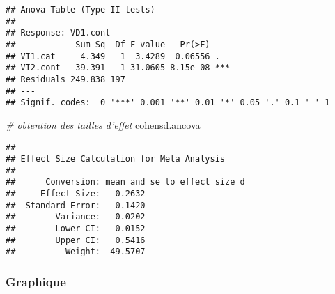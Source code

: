 \documentclass[
]{book}
\newenvironment{Shaded}{\begin{snugshade}}{\end{snugshade}}
\newcommand{\CommentTok}[1]{\textcolor[rgb]{0.56,0.35,0.01}{\textit{#1}}}
\newcommand{\NormalTok}[1]{#1}
\begin{document}
\begin{verbatim}
## Anova Table (Type II tests)
## 
## Response: VD1.cont
##            Sum Sq  Df F value   Pr(>F)    
## VI1.cat     4.349   1  3.4289  0.06556 .  
## VI2.cont   39.391   1 31.0605 8.15e-08 ***
## Residuals 249.838 197                     
## ---
## Signif. codes:  0 '***' 0.001 '**' 0.01 '*' 0.05 '.' 0.1 ' ' 1
\end{verbatim}

\begin{Shaded}
\begin{Highlighting}[]
\CommentTok{# obtention des tailles d'effet }
\NormalTok{cohensd.ancova}
\end{Highlighting}
\end{Shaded}

\begin{verbatim}
## 
## Effect Size Calculation for Meta Analysis
## 
##      Conversion: mean and se to effect size d
##     Effect Size:   0.2632
##  Standard Error:   0.1420
##        Variance:   0.0202
##        Lower CI:  -0.0152
##        Upper CI:   0.5416
##          Weight:  49.5707
\end{verbatim}

\hypertarget{graphique-5}{%
\subsubsection{Graphique}\label{graphique-5}}
\end{document}
